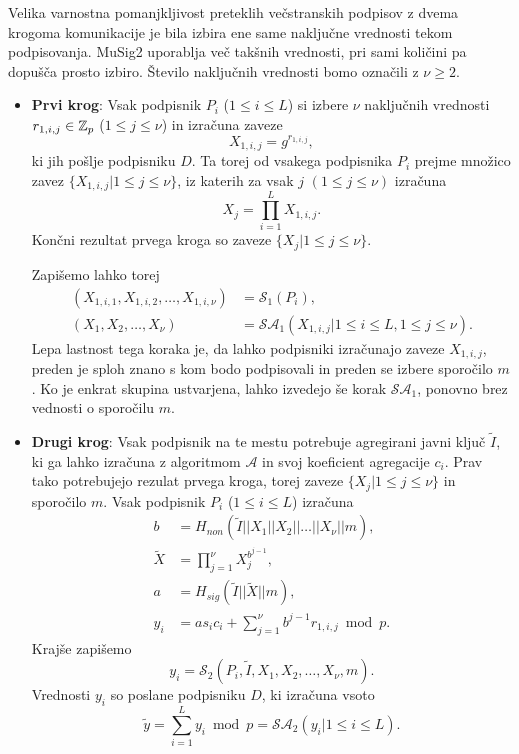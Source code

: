 Velika varnostna pomanjkljivost preteklih večstranskih podpisov z dvema krogoma komunikacije je bila
izbira ene same naključne vrednosti tekom podpisovanja. MuSig2 uporablja več takšnih vrednosti, pri
sami količini pa dopušča prosto izbiro. Število naključnih vrednosti bomo označili z $\nu \geq 2$.
\begin{itemize}
    \item \textbf{Prvi krog}:
        Vsak podpisnik $P_i$ ($1 \le i \le L$) si izbere $\nu$ naključnih
        vrednosti $r_{1, i, j} \in \mathbb Z_p$ ($1 \le j \le \nu$) in izračuna zaveze
        $$
        X_{1, i, j} = g^{r_{1, i, j}},
        $$
        ki jih pošlje podpisniku $D$. Ta torej od vsakega podpisnika $P_i$ prejme množico zavez
        $\{X_{1, i, j} | 1 \le j \le \nu\}$, iz katerih za vsak $j$ $(1 \le j \le \nu)$ izračuna
        $$
        X_j = \prod_{i=1}^L X_{1, i, j}.
        $$
        Končni rezultat prvega kroga so zaveze $\{X_j | 1 \le j \le \nu\}$.

        Zapišemo lahko torej
        \begin{align*}
            (X_{1, i, 1}, X_{1, i, 2}, \dots, X_{1, i, \nu}) &= \mathcal{S}_1(P_i), \\
            (X_1, X_2, \dots, X_\nu) &= \mathcal{S}\mathcal{A}_1(X_{1, i, j} | 1 \le i \le L, 1 \le j \le \nu).
        \end{align*}
        Lepa lastnost tega koraka je, da lahko podpisniki izračunajo zaveze $X_{1, i, j}$, preden je
        sploh znano s kom bodo podpisovali in preden se izbere sporočilo $m$. Ko je enkrat skupina
        ustvarjena, lahko izvedejo še korak $\mathcal{S}\mathcal{A}_1$, ponovno brez vednosti o
        sporočilu $m$.

    \item \textbf{Drugi krog}:
        Vsak podpisnik na te mestu potrebuje agregirani javni ključ $\tilde{I}$, ki ga lahko izračuna
        z algoritmom $\mathcal{A}$ in svoj koeficient agregacije $c_i$. Prav tako potrebujejo rezulat
        prvega kroga, torej zaveze $\{X_j | 1 \le j \le \nu\}$ in sporočilo $m$. Vsak podpisnik $P_i$
        ($1 \le i \le L$) izračuna
        \begin{align*}
            b &= H_{non}(\tilde{I} || X_1 || X_2 || \dots || X_\nu || m), \\
            \tilde{X} &= \prod_{j=1}^\nu X_j^{b^{j-1}}, \\
            a &= H_{sig}(\tilde{I} || \tilde{X} || m), \\
            y_i &= a s_i c_i + \sum_{j=1}^\nu b^{j-1} r_{1, i, j} \bmod p.
        \end{align*}
        Krajše zapišemo
        $$
        y_i = \mathcal{S}_2(P_i, \tilde{I}, X_1, X_2, \dots, X_\nu, m).
        $$
        Vrednosti $y_i$ so poslane podpisniku $D$, ki izračuna vsoto
        $$
        \tilde{y} = \sum_{i=1}^L y_i \bmod p = \mathcal{S}\mathcal{A}_2(y_i | 1 \le i \le L).
        $$


\end{itemize}
